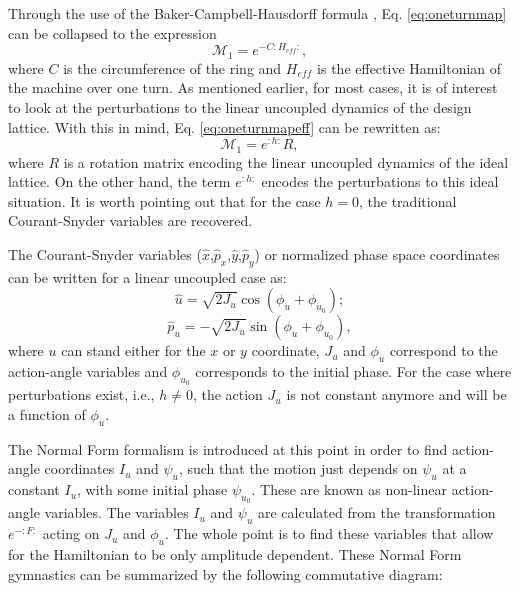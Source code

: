 Through the use of the Baker-Campbell-Hausdorff formula \cite{bch}, Eq. \ref{eq:oneturnmap} can be collapsed to the expression 
\begin{equation}
    \label{eq:oneturnmapeff}
    \mathcal{M}_1=e^{-C :H_{eff}:},
\end{equation}
where $C$ is the circumference of the ring and $H_{eff}$ is the effective Hamiltonian of the machine over one turn. As mentioned earlier, for most cases, it is of interest to look at the perturbations to the linear uncoupled dynamics of the design lattice. With this in mind, Eq. \ref{eq:oneturnmapeff} can be rewritten as:
\begin{equation}
    \label{eq:oneturnmapeff1}
    \mathcal{M}_1=e^{:h:}R,
\end{equation}
where $R$ is a rotation matrix encoding the linear uncoupled dynamics of the ideal lattice. On the other hand, the term $e^{:h:}$ encodes the perturbations to this ideal situation. It is worth pointing out that for the case $h=0$, the traditional Courant-Snyder variables are recovered.   

The Courant-Snyder variables ($\hat{x}$,$\hat{p}_x$,$\hat{y}$,$\hat{p}_y$) or normalized phase space coordinates can be written for a linear uncoupled case as:
\begin{equation}
    \label{eq:norm1}
    \hat{u}=\sqrt{2J_u} \cos \left( \phi_u + \phi_{u_0}\right);
\end{equation}
\begin{equation}
    \label{eq:norm2}
    \hat{p}_u=-\sqrt{2J_u} \sin \left( \phi_u + \phi_{u_0}\right),
\end{equation}
where $u$ can stand either for the $x$ or $y$ coordinate, $J_u$ and $\phi_u$ correspond to the action-angle variables and $\phi_{u_0}$ corresponds to the initial phase. For the case where perturbations exist, i.e., $h \neq 0$, the action $J_u$ is not constant anymore and will be a function of $\phi_u$.  

The Normal Form formalism is introduced at this point in order to find action-angle coordinates $I_u$ and $\psi_u$, such that the motion just depends on $\psi_u$ at a constant $I_u$, with some initial phase $\psi_{u_0}$. These are known as non-linear action-angle variables. The variables $I_u$ and $\psi_u$ are calculated from the transformation $e^{-:F:}$ acting on $J_u$ and $\phi_u$. The whole point is to find these variables that allow for the Hamiltonian to be only amplitude dependent. These Normal Form gymnastics can be summarized by the following commutative diagram: 

